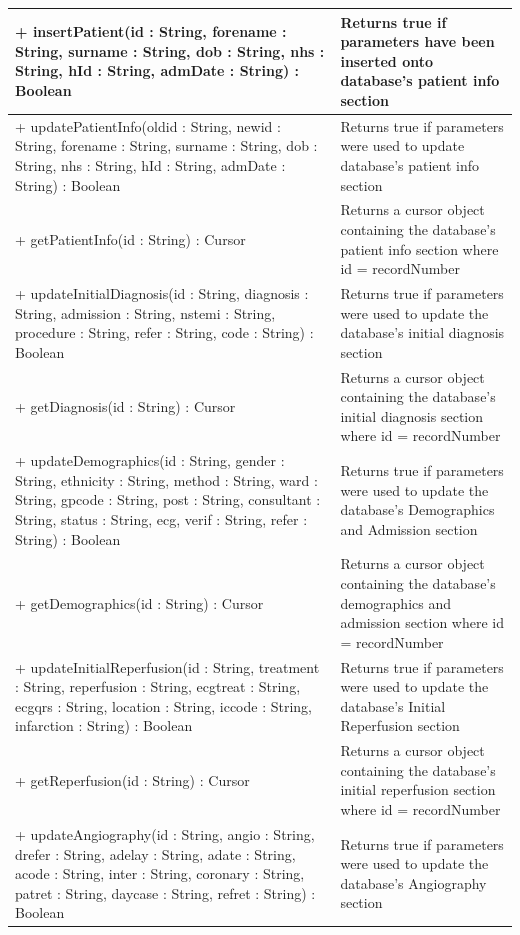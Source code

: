 \documentclass[12pt,a4paper,oneside,titlepage]{article}
\begin{document}
\begin{center}
	\begin{tabular}{| p{13cm} | p{5cm} |}
	\hline	
	+ insertPatient(id : String, forename : String, surname : String, dob : String, nhs : String, hId : String, admDate : String) : Boolean & Returns true if parameters have been inserted onto database's patient info section \\ \hline
	+ updatePatientInfo(oldid : String, newid : String, forename : String, surname : String, dob : String, nhs : String, hId : String, admDate : String) : Boolean & Returns true if parameters were used to update database's patient info section \\ \hline
	+ getPatientInfo(id : String) : Cursor & Returns a cursor object containing the database's patient info section where id = recordNumber \\ \hline
	+ updateInitialDiagnosis(id : String, diagnosis : String, admission : String, nstemi : String, procedure : String, refer : String, code : String) : Boolean & Returns true if parameters were used to update the database's initial diagnosis section \\ \hline
	+ getDiagnosis(id : String) : Cursor & Returns a cursor object containing the database's initial diagnosis section where id = recordNumber \\ \hline
	+ updateDemographics(id : String, gender : String, ethnicity : String, method : String, ward : String, gpcode : String, post : String, consultant : String, status : String, ecg, verif : String, refer : String) : Boolean & Returns true if parameters were used to update the database's Demographics and Admission section \\ \hline
	+ getDemographics(id : String) : Cursor & Returns a cursor object containing the database's demographics and admission section where id = recordNumber \\ \hline
	+ updateInitialReperfusion(id : String, treatment : String, reperfusion : String, ecgtreat : String, ecgqrs : String, location : String, iccode : String, infarction : String) : Boolean & Returns true if parameters were used to update the database's Initial Reperfusion section \\ \hline
	+ getReperfusion(id : String) : Cursor & Returns a cursor object containing the database's initial reperfusion section where id = recordNumber \\ \hline
	+ updateAngiography(id : String, angio : String, drefer : String, adelay : String, adate : String, acode : String, inter : String, coronary : String, patret : String, daycase : String, refret : String) : Boolean & Returns true if parameters were used to update the database's Angiography section \\ \hline
		\end{tabular}
\end{center}
	
\end{document}
